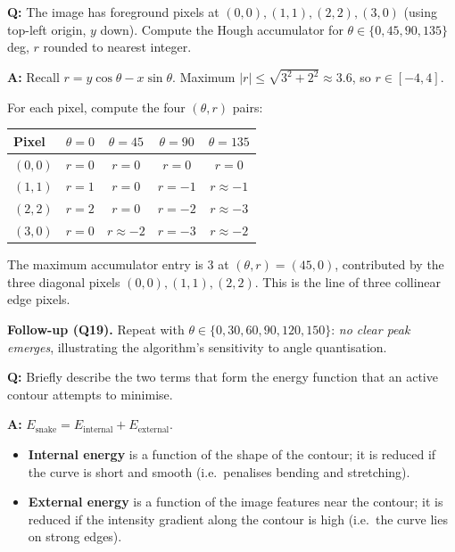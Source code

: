 \begin{exbox}
\textbf{Q:} The image has foreground pixels at $(0,0), (1,1), (2,2), (3,0)$ (using top-left origin, $y$ down). Compute the Hough accumulator for $\theta \in \{0, 45, 90, 135\}$ deg, $r$ rounded to nearest integer.

\textbf{A:} Recall $r = y\cos\theta - x\sin\theta$. Maximum $|r| \leq \sqrt{3^2 + 2^2} \approx 3.6$, so $r \in [-4, 4]$.

For each pixel, compute the four $(\theta, r)$ pairs:
\begin{center}
\renewcommand{\arraystretch}{1.2}
\begin{tabular}{@{} l c c c c @{}}
\toprule
\textbf{Pixel} & $\theta=0$ & $\theta=45$ & $\theta=90$ & $\theta=135$ \\
\midrule
$(0,0)$ & $r=0$ & $r=0$ & $r=0$ & $r=0$ \\
$(1,1)$ & $r=1$ & $r=0$ & $r=-1$ & $r\approx -1$ \\
$(2,2)$ & $r=2$ & $r=0$ & $r=-2$ & $r\approx -3$ \\
$(3,0)$ & $r=0$ & $r\approx -2$ & $r=-3$ & $r\approx -2$ \\
\bottomrule
\end{tabular}
\end{center}

The maximum accumulator entry is $3$ at $(\theta, r) = (45, 0)$, contributed by the three diagonal pixels $(0,0), (1,1), (2,2)$. This is the line of three collinear edge pixels.

\textbf{Follow-up (Q19).} Repeat with $\theta \in \{0, 30, 60, 90, 120, 150\}$: \emph{no clear peak emerges}, illustrating the algorithm's sensitivity to angle quantisation.
\end{exbox}

\begin{exbox}
\textbf{Q:} Briefly describe the two terms that form the energy function that an active contour attempts to minimise.

\textbf{A:} $E_{\text{snake}} = E_{\text{internal}} + E_{\text{external}}$.
\begin{itemize}
  \item \textbf{Internal energy} is a function of the shape of the contour; it is reduced if the curve is short and smooth (i.e.\ penalises bending and stretching).
  \item \textbf{External energy} is a function of the image features near the contour; it is reduced if the intensity gradient along the contour is high (i.e.\ the curve lies on strong edges).
\end{itemize}
\end{exbox}

